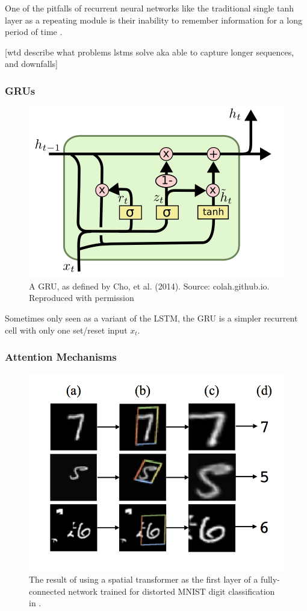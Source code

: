 One of the pitfalls of recurrent neural networks like the traditional single tanh layer as a repeating module is their inability to remember information for a long period of time \cite{Hochreiter:1997:LSM:1246443.1246450}.

[wtd describe what problems lstms solve aka able to capture longer sequences, and downfalls]

\subsubsection{GRUs}

\begin{figure}[h]
    \centering
	\includegraphics[width=.8\textwidth]{./images/illustrations/GRU}
    \caption{A GRU, as defined by Cho, et al. (2014). Source: colah.github.io. Reproduced with permission}
    \label{fig:mesh1}
\end{figure}



Sometimes only seen as a variant of the LSTM, the GRU is a simpler recurrent cell with only one set/reset input $x_t$.


\subsubsection{Attention Mechanisms}

\begin{figure}[h]
    \centering
	\includegraphics[width=.5\textwidth]{./images/illustrations/attention}
    \caption{The result of using a spatial transformer as the
first layer of a fully-connected network trained for distorted
MNIST digit classification in \cite{DBLP:journals/corr/JaderbergSZK15}.}
    \label{fig:attention}
\end{figure}




